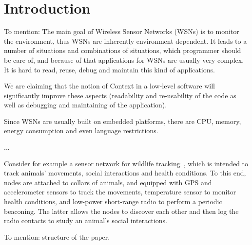 \section{Introduction} To mention: The main goal of Wireless Sensor Networks
(WSNs) is to monitor the environment, thus WSNs are inherently environment
dependent. It leads to a number of situations and combinations of situations,
which programmer should be care of, and because of that applications for WSNs
are usually very complex. It is hard to read, reuse, debug and maintain this
kind of applications.

We are claiming that the notion of Context in a low-level software will
significantly improve these aspects (readability and re-usability of the code
as well as debugging and maintaining of the application).

Since WSNs are usually built on embedded platforms, there are CPU, memory,
energy consumption and even language restrictions.

...

Consider for example a sensor network for wildlife tracking~\cite{pasztor10},
which is intended to track animals' movements, social interactions and health
conditions. To this end, nodes are attached to collars of animals, and equipped
with GPS and accelerometer sensors to track the movements, temperature sensor
to monitor health conditions, and low-power short-range radio to perform a
periodic beaconing. The latter allows the nodes to discover each other and then
log the radio contacts to study an animal's social interactions.

To mention: structure of the paper.